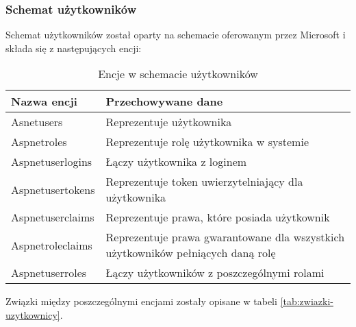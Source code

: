 \subsubsection{Schemat użytkowników}

Schemat użytkowników został oparty na schemacie oferowanym przez Microsoft 
\parencite{vickers2021} i składa się z następujących encji:

    \begin{xltabular}{1\textwidth} { 
        | >{\raggedright\arraybackslash}X        
        | >{\raggedleft\arraybackslash}X | }
        \caption{Encje w schemacie użytkowników} \label{tab:encje-uzytkownicy}\\
        \hline
       Nazwa encji & Przechowywane dane \\
       \hline
       Asnetusers & Reprezentuje użytkownika \\
       \hline
       Aspnetroles & Reprezentuje rolę użytkownika w systemie \\
       \hline
       Aspnetuserlogins & Łączy użytkownika z loginem \\
       \hline
       Aspnetusertokens & Reprezentuje token uwierzytelniający dla użytkownika \\
       \hline
       Aspnetuserclaims & Reprezentuje prawa, które posiada użytkownik \\
       \hline
       Aspnetroleclaims & Reprezentuje prawa gwarantowane dla wszystkich użytkowników
       pełniących daną rolę \\
       \hline
       Aspnetuserroles & Łączy użytkowników z poszczególnymi rolami \\
       \hline
    \end{xltabular}

Związki między poszczególnymi encjami zostały opisane w tabeli \ref{tab:zwiazki-uzytkownicy}.

